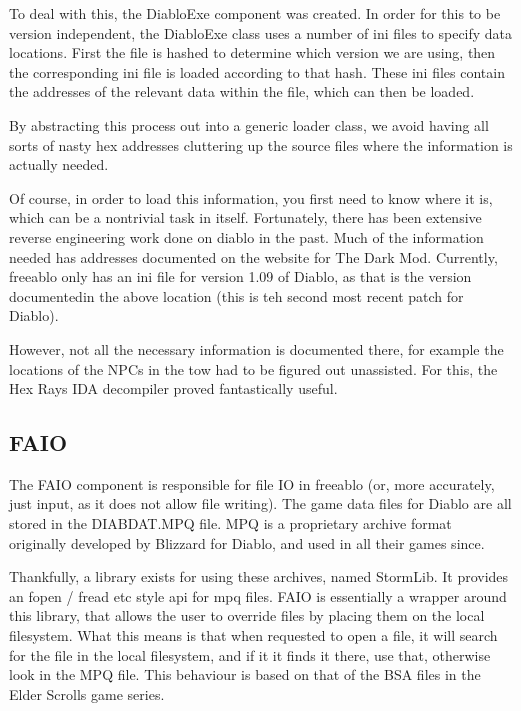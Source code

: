 	To deal with this, the DiabloExe component was created. In order for this to be version independent, the DiabloExe class uses a number of ini files to specify data locations. First the file is hashed to determine which version we are using, then the corresponding ini file is loaded according to that hash. These ini files contain the addresses of the relevant data within the file, which can then be loaded.
	
	By abstracting this process out into a generic loader class, we avoid having all sorts of nasty hex addresses cluttering up the source files where the information is actually needed.
	
	Of course, in order to load this information, you first need to know where it is, which can be a nontrivial task in itself. Fortunately, there has been extensive reverse engineering work done on diablo in the past. Much of the information needed has addresses documented on the website for The Dark Mod\cite{dmodhex}. Currently, freeablo only has an ini file for version 1.09 of Diablo, as that is the version documentedin the above location (this is teh second most recent patch for Diablo).
	
	However, not all the necessary information is documented there, for example the locations of the NPCs in the tow had to be figured out unassisted. For this, the Hex Rays IDA\cite{hexrays} decompiler proved fantastically useful.

\subsection{FAIO}
	The FAIO component is responsible for file IO in freeablo (or, more accurately, just input, as it does not allow file writing).
	The game data files for Diablo are all stored in the DIABDAT.MPQ file. MPQ is a proprietary archive format originally developed by Blizzard for Diablo, and used in all their games since.
	
	Thankfully, a library exists for using these archives, named StormLib\cite{stormlib}. It provides an fopen / fread etc style api for mpq files.
	FAIO is essentially a wrapper around this library, that allows the user to override files by placing them on the local filesystem. What this means is that when requested to open a file, it will search for the file in the local filesystem, and if it it finds it there, use that, otherwise look in the MPQ file.
	This behaviour is based on that of the BSA files in the Elder Scrolls game series.
	
